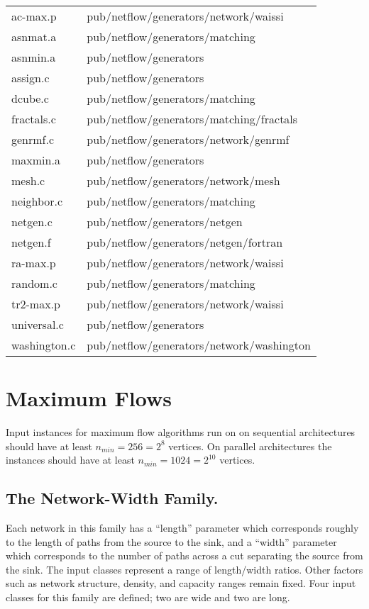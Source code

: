 \begin{tabular}{ll} \hline 
ac-max.p & pub/netflow/generators/network/waissi \\ asnmat.a &
pub/netflow/generators/matching \\ asnmin.a & pub/netflow/generators
\\ assign.c & pub/netflow/generators \\ dcube.c &
pub/netflow/generators/matching \\ fractals.c &
pub/netflow/generators/matching/fractals \\ genrmf.c &
pub/netflow/generators/network/genrmf \\ maxmin.a &
pub/netflow/generators \\ mesh.c & pub/netflow/generators/network/mesh
\\ neighbor.c & pub/netflow/generators/matching \\ netgen.c &
pub/netflow/generators/netgen \\ netgen.f &
pub/netflow/generators/netgen/fortran \\ ra-max.p &
pub/netflow/generators/network/waissi \\ random.c &
pub/netflow/generators/matching \\ tr2-max.p &
pub/netflow/generators/network/waissi \\ universal.c &
pub/netflow/generators \\ washington.c &
pub/netflow/generators/network/washington \\ \hline
\end{tabular} 

\section{Maximum Flows}

Input instances for maximum flow algorithms run on on sequential
architectures should have at least $n_{min} = 256 = 2^{8} $ vertices.
On parallel architectures the instances should have at least $n_{min}
= 1024 = 2^{10}$ vertices.

\subsection{The Network-Width Family.}

Each network in this family has a ``length'' parameter which
corresponds roughly to the length of paths from the source to the
sink, and a ``width'' parameter which corresponds to the number of
paths across a cut separating the source from the sink.  The input
classes represent a range of length/width ratios.  Other factors such
as network structure, density, and capacity ranges remain fixed.  Four
input classes for this family are defined; two are wide and two
are long.  

